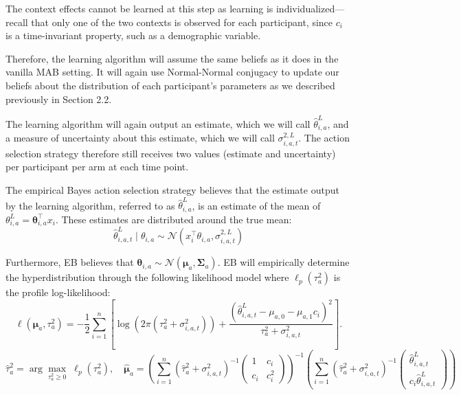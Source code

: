 The context effects cannot be learned at this step as learning is individualized—recall that only one of the two contexts is observed for each participant, since $c_i$ is a time-invariant property, such as a demographic variable. 

Therefore, the learning algorithm will assume the same beliefs as it does in the vanilla MAB setting. It will again use Normal-Normal conjugacy to update our beliefs about the distribution of each participant's parameters as we described previously in Section 2.2. 

The learning algorithm will again output an estimate, which we will call $\hat{\theta}_{i,a}^{L}$, and a measure of uncertainty about this estimate, which we will call $\sigma_{i,a,t}^{2,L}$. The action selection strategy therefore still receives two values (estimate and uncertainty) per participant per arm at each time point.



The empirical Bayes action selection strategy believes that the estimate output by the learning algorithm, referred to as $\hat{\theta}_{i,a}^{L}$, is an estimate of the mean of $\theta_{i,a}^{L}=\boldsymbol{\theta}_{i,a}^{\top}x_i$. These estimates are distributed around the true mean:
$$\hat{\theta}_{i,a,t}^{L}\mid\theta_{i,a}
\sim
\mathcal{N}(x_i^\top\theta_{i,a},\sigma_{i,a,t}^{2,L})$$

Furthermore, EB believes that $\boldsymbol{\theta}_{i,a} \sim \mathcal{N}(\boldsymbol{\mu}_a, \boldsymbol{\Sigma}_a)$. EB will empirically determine the hyperdistribution through the following likelihood model where $\ell_p(\tau_a^2)$ is the profile log-likelihood:
$$\ell(\boldsymbol{\mu}_a,\tau_a^2)
=
-\frac12
\sum_{i=1}^n
\left[
\log\!\left(2\pi(\tau_a^2+\sigma^2_{i,a,t})\right)
+
\frac{
\left(\hat{\theta}^{L}_{i,a,t}-\mu_{a,0}-\mu_{a,1}c_i\right)^2
}{
\tau_a^2+\sigma^2_{i,a,t}
}
\right].$$
$$\hat{\tau}_a^2
=
\arg\max_{\tau_a^2\ge 0}\;
\ell_p(\tau_a^2), \quad \hat{\boldsymbol{\mu}}_a
=
\left(
\sum_{i=1}^{n}
(\hat{\tau}_a^2+\sigma^2_{i,a,t})^{-1}
\begin{pmatrix}
1 & c_i\\
c_i & c_i^2
\end{pmatrix}
\right)^{-1}
\left(
\sum_{i=1}^{n}
(\hat{\tau}_a^2+\sigma^2_{i,a,t})^{-1}
\begin{pmatrix}
\hat{\theta}^{L}_{i,a,t}\\
c_i\hat{\theta}^{L}_{i,a,t}
\end{pmatrix}
\right)$$

